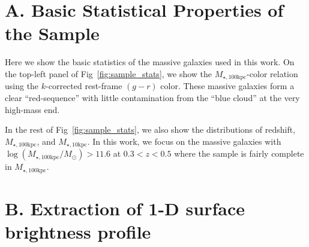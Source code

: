 \documentclass[a4paper,fleqn,usenatbib]{mnras}
\def\nbcg{\texttt{cenLowMh}}
\def\mstar{{$M_{\star}$}}
\def\mhalo{{$M_{\mathrm{200b}}$}}
\def\minn{{$M_{\star,10\mathrm{kpc}}$}}
\def\mtot{{$M_{\star,100\mathrm{kpc}}$}}
\def\logmtot{{$\log (M_{\star,100\mathrm{kpc}}/M_{\odot})$}}
\begin{document}
\section{A. Basic Statistical Properties of the Sample} 
	\label{app:basic} 
    
    Here we show the basic statistics of the massive galaxies used in this work.
    On the top-left panel of Fig~\ref{fig:sample_stats}, we show the \mtot{}-color 
    relation using the $k$-corrected rest-frame $(g-r)$ color. 
    These massive galaxies form a clear ``red-sequence'' with little contamination 
    from the ``blue cloud'' at the very high-mass end.
    
    In the rest of Fig~\ref{fig:sample_stats}, we also show the distributions of 
    redshift, \mtot{}, and \minn{}.
    In this work, we focus on the massive galaxies with \logmtot{}$>11.6$ at 
    $0.3 < z < 0.5$ where the sample is fairly complete in \mtot{}.
    
    
    
\section{B. Extraction of 1-D surface brightness profile} 
    \label{app:ellipse} 
    
\end{document}
